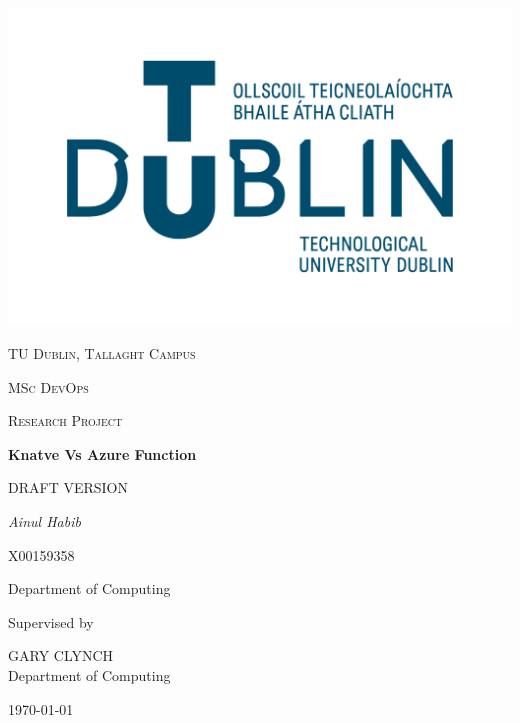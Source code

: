 \documentclass[12pt]{article}
\begin{document}
\thispagestyle{empty}
\setlength\headheight{0pt} 
\begin{center}

\begin{center}
\includegraphics[width=0.65\linewidth]{images/TUD_Logo.png}            
\end{center}	

        \vspace{0.25cm}
        {\scshape\LARGE TU Dublin, Tallaght Campus \par}
        \vspace{0.25cm}
        {\scshape\Large MSc DevOps\par}
        {\scshape\Large Research Project }
        \vspace{0.5cm}

        {\Large\bfseries Knatve Vs Azure Function\par}
          {\scshape\small DRAFT VERSION\par}
        
        \vspace{0.5cm}
        {\Large\itshape Ainul Habib\par}
        {\scshape\small X00159358 \par}
        Department of Computing
        \vspace{0.25cm}

\vspace{1cm}
Supervised by\par
GARY CLYNCH \\
Department of Computing\par
\large
\today

\end{center}

\clearpage
\restoregeometry
\justify
\end{document}
